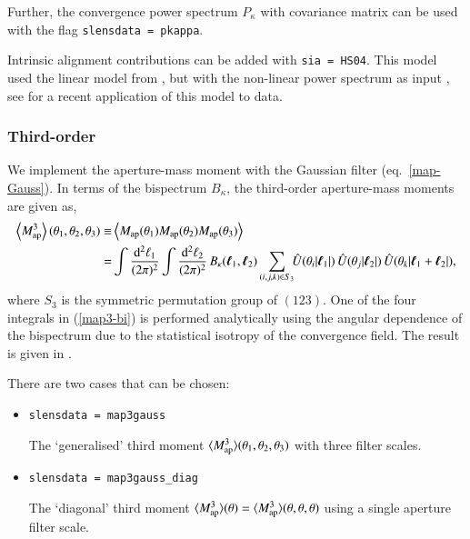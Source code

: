 \documentclass[11pt, chapterprefix, headsepline]{scrartcl}
\begin{document}
\bigskip

Further, the convergence power spectrum $P_\kappa$ with covariance matrix can
be used with the flag \texttt{slensdata = pkappa}.

Intrinsic alignment contributions can be added with \texttt{sia = HS04}. This
model used the linear model from \cite{2004PhRvD..70f3526H}, but with the
non-linear power spectrum as input \citep{2007NJPh....9..444B}, see \cite{CFHTLenS-IA}
for a recent application of this model to data.


\subsubsection{Third-order}

We implement the aperture-mass moment \citep{2003ApJ...592..664P,
  JBJ04, SKL05} with the Gaussian filter (eq.~\ref{map-Gauss}). In terms of the bispectrum $B_\kappa$,
the third-order aperture-mass moments are given as,
%
\begin{align}
   \left\langle{M_{\rm ap}^3}\right\rangle(\theta_1, \theta_2, \theta_3) \equiv &
   \left\langle M_{\rm ap}(\theta_1)M_{\rm ap}(\theta_2)M_{\rm ap}(\theta_3) \right\rangle
   \nonumber \\
   = & \int \frac{{\mathrm d}^2\ell_1}{(2\pi)^2}
   \int \frac{{\mathrm d}^2\ell_2}{(2\pi)^2}\,B_\kappa(\boldsymbol{\ell}_1,\boldsymbol{\ell}_2)
   \sum\limits_{(i,j,k) \in S_3}
   \!\!
   \hat
   U(\theta_i|\boldsymbol{\ell}_1|)\,\hat U(\theta_j|\boldsymbol{\ell}_2|)\,
   \hat U(\theta_k |\boldsymbol{\ell}_1+\boldsymbol{\ell}_2|),
   \label{map3-bi}
\end{align}
%
where $S_3$ is the symmetric permutation group of $(123)$.  One of the
four integrals in (\ref{map3-bi}) is performed analytically
using the angular dependence of the bispectrum due to the statistical
isotropy of the convergence field. The result is given in
\cite{KS05}.

There are two cases that can be chosen:

\begin{itemize}

  \item \texttt{slensdata = map3gauss}

    The `generalised' third moment
    $\langle M_{\rm ap}^3 \rangle(\theta_1, \theta_2,
    \theta_3)$ with three filter scales.

  \item \texttt{slensdata = map3gauss\_diag}

    The `diagonal' third moment $\langle M_{\rm ap}^3 \rangle(\theta) = \langle M_{\rm ap}^3 \rangle(\theta, \theta, \theta)$
    using a single aperture filter scale.

\end{itemize}
\end{document}
